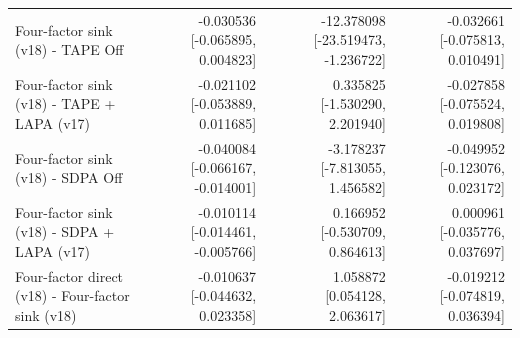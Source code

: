 \begin{table}[t]
\begin{tabular}{lrrr}
Four-factor sink (v18) - TAPE Off & -0.030536 [-0.065895, 0.004823] & -12.378098 [-23.519473, -1.236722] & -0.032661 [-0.075813, 0.010491] \\
Four-factor sink (v18) - TAPE + LAPA (v17) & -0.021102 [-0.053889, 0.011685] & 0.335825 [-1.530290, 2.201940] & -0.027858 [-0.075524, 0.019808] \\
Four-factor sink (v18) - SDPA Off & -0.040084 [-0.066167, -0.014001] & -3.178237 [-7.813055, 1.456582] & -0.049952 [-0.123076, 0.023172] \\
Four-factor sink (v18) - SDPA + LAPA (v17) & -0.010114 [-0.014461, -0.005766] & 0.166952 [-0.530709, 0.864613] & 0.000961 [-0.035776, 0.037697] \\
Four-factor direct (v18) - Four-factor sink (v18) & -0.010637 [-0.044632, 0.023358] & 1.058872 [0.054128, 2.063617] & -0.019212 [-0.074819, 0.036394] \\
\bottomrule
\end{tabular}
\end{table}
